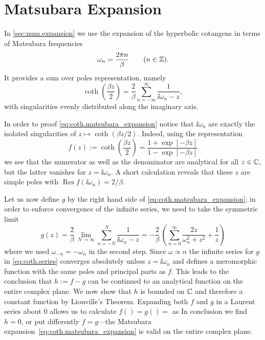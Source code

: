 \section{Matsubara Expansion}
\label{sec:coth.matsubara}

In \autoref{sec:num.expansion} we use the expansion of the hyperbolic cotangens in terms of Matsubara frequencies \cite{Ma00_many_particle}
\begin{equation}
  \omega_n = \frac{2\pi n}{\beta} \qquad (n \in \mathbb{Z}).
  \label{eq:coth.matsubara_freq}
\end{equation}
It provides a sum over poles representation, namely
\begin{equation}
  \coth\left(\frac{\beta z}{2}\right) = \frac{2}{\beta} \sum_{n=-\infty}^\infty \frac{1}{\ii\omega_n - z},
  \label{eq:coth.matsubara_expansion}
\end{equation}
with singularities evenly distributed along the imaginary axis.

In order to proof \autoref{eq:coth.matsubara_expansion} notice that $\ii\omega_n$ are exactly the isolated singularities of $z \mapsto \coth(\beta z / 2)$.
Indeed, using the representation
\begin{equation}
  f(z) := \coth\left(\frac{\beta z}{2}\right) = \frac{1 + \exp[-\beta z]}{1 - \exp[-\beta z]}
  \label{eq:coth.representation}
\end{equation}
we see that the numerator as well as the denominator are analytical for all $z \in \mathbb{C}$, but the latter vanishes for $z = \ii \omega_n$.
A short calculation reveals that these $z$ are simple poles with $\operatorname{Res}f(\ii\omega_n) = 2/\beta$.

Let us now define $g$ by the right hand side of \autoref{eq:coth.matsubara_expansion}; in order to enforce convergence of the infinite series, we need to take the symmetric limit
\begin{equation}
  g(z) = \frac{2}{\beta} \, \lim_{N\to\infty} \sum_{n=-N}^{N} \frac{1}{\ii\omega_n - z} = - \frac{2}{\beta} \, \left( \sum_{n=0}^\infty \frac{2z}{\omega_n^2 + z^2} + \frac{1}{z} \right)
  \label{eq:coth.series}
\end{equation}
where we used $\omega_{-n} = -\omega_n$ in the second step.
Since $\omega\propto n$ the infinite series for $g$ in \autoref{eq:coth.series} converges absolutely unless $z = \ii\omega_n$ and defines a meromorphic function with the same poles and principal parts as $f$.
This leads to the conclusion that $h := f - g$ can be continued to an analytical function on the entire complex plane.
We now show that $h$ is bounded on $\mathbb{C}$ and therefore a constant function by Liouville's Theorem.
Expanding both $f$ and $g$ in a Laurent series about 0 allows us to calculate $f() = g() = $ as %
In conclusion we find $h = 0$, or put differently $f = g$---the Matsubara expansion~\ref{eq:coth.matsubara_expansion} is valid on the entire complex plane.

%
